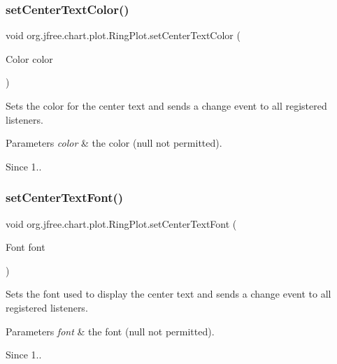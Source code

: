 \subsubsection{\texorpdfstring{set\+Center\+Text\+Color()}{setCenterTextColor()}}
{\footnotesize\ttfamily void org.\+jfree.\+chart.\+plot.\+Ring\+Plot.\+set\+Center\+Text\+Color (\begin{DoxyParamCaption}\item[{Color}]{color }\end{DoxyParamCaption})}

Sets the color for the center text and sends a change event to all registered listeners.


\begin{DoxyParams}{Parameters}
{\em color} & the color ({\ttfamily null} not permitted).\\
\hline
\end{DoxyParams}
\begin{DoxySince}{Since}
1.. 
\end{DoxySince}
\mbox{\label{classorg_1_1jfree_1_1chart_1_1plot_1_1_ring_plot_a485f817c67a6f8b873577d0d316552c7}} 
\subsubsection{\texorpdfstring{set\+Center\+Text\+Font()}{setCenterTextFont()}}
{\footnotesize\ttfamily void org.\+jfree.\+chart.\+plot.\+Ring\+Plot.\+set\+Center\+Text\+Font (\begin{DoxyParamCaption}\item[{Font}]{font }\end{DoxyParamCaption})}

Sets the font used to display the center text and sends a change event to all registered listeners.


\begin{DoxyParams}{Parameters}
{\em font} & the font ({\ttfamily null} not permitted).\\
\hline
\end{DoxyParams}
\begin{DoxySince}{Since}
1.. 
\end{DoxySince}
\mbox{\label{classorg_1_1jfree_1_1chart_1_1plot_1_1_ring_plot_a83052ee445b23af33a885ef9d6b295c4}} 

